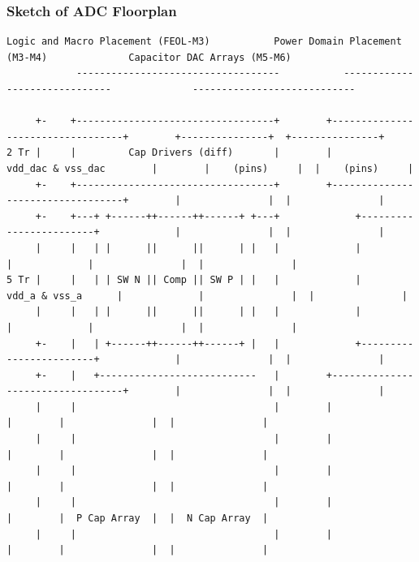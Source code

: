 \documentclass[aspectratio=169]{beamer}
\begin{document}
\begin{frame}[fragile]
  \frametitle{Sketch of ADC Floorplan}
  \begin{center}
  \begin{lstlisting}[basicstyle=\ttfamily\fontsize{4}{5}\selectfont]
            Logic and Macro Placement (FEOL-M3)           Power Domain Placement (M3-M4)              Capacitor DAC Arrays (M5-M6)
            -----------------------------------           ------------------------------              ----------------------------

     +-    +----------------------------------+        +----------------------------------+        +---------------+  +---------------+
2 Tr |     |         Cap Drivers (diff)       |        |         vdd_dac & vss_dac        |        |    (pins)     |  |    (pins)     |
     +-    +----------------------------------+        +----------------------------------+        |               |  |               |
     +-    +---+ +------++------++------+ +---+             +------------------------+             |               |  |               |
     |     |   | |      ||      ||      | |   |             |                        |             |               |  |               |
5 Tr |     |   | | SW N || Comp || SW P | |   |             |     vdd_a & vss_a      |             |               |  |               |
     |     |   | |      ||      ||      | |   |             |                        |             |               |  |               |
     +-    |   | +------++------++------+ |   |             +------------------------+             |               |  |               |
     +-    |   +---------------------------   |        +----------------------------------+        |               |  |               |
     |     |                                  |        |                                  |        |               |  |               |
     |     |                                  |        |                                  |        |               |  |               |
     |     |                                  |        |                                  |        |               |  |               |
     |     |                                  |        |                                  |        |  P Cap Array  |  |  N Cap Array  |
     |     |                                  |        |                                  |        |               |  |               |

\end{lstlisting}
\end{center}
\end{frame}
\end{document}
